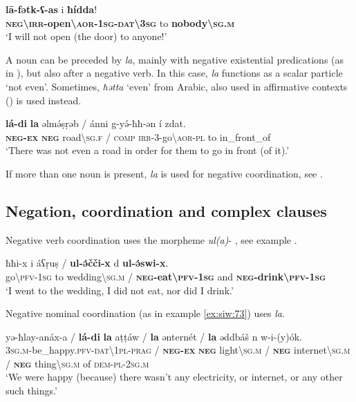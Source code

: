 \documentclass[output=paper,colorlinks,citecolor=brown]{langscibook}
\begin{document}
\ea\label{ex:siw:70}
    \gll \textbf{l\={a}-fətk-ʕ-as} i \textbf{ħídda}! \\
         \textbf{\textsc{neg{\textbackslash}irr}-open{\textbackslash}\textsc{aor-1sg-dat\textbackslash3sg}} to \textbf{nobody{\textbackslash}\textsc{sg.m}}  \\
    \glt ‘I will not open (the door) to anyone!’
\z

A noun can be preceded by \textit{la}, mainly with negative existential predications (as in ), but also after a negative verb. In this case, \textit{la} functions as a scalar particle ‘not even’. Sometimes, \textit{ħətta} ‘even’ from Arabic, also used in affirmative contexts (\citealt[214, 220]{Souag2013}) is used instead.

\ea\label{ex:siw:71}
    \gll \textbf{lá-di} \textbf{la} əlmə́ṣṛəb / ánni g-yə́-ħħ{}-ən \'{i}  zdat. \\
          \textbf{\textsc{neg-ex}} \textsc{\textbf{neg}} road{\textbackslash}\textsc{sg.f} / \textsc{comp} \textsc{irr-3}{}-go{\textbackslash}\textsc{aor-pl} to in\_front\_of \\
    \glt ‘There was not even a road in order for them to go in front (of it).’
\z

If more than one noun is present, \textit{la} is used for negative coordination, see . 


\subsection{Negation, coordination and complex clauses}\label{sec:siw:4.5}

Negative verb coordination uses the morpheme \textit{ul(a)}{}- \citep[54]{Schiattarella2017}, see example .

\ea\label{ex:siw:72}
    \gll ħħi-x i áʕṛuṣ / \textbf{ul-ə́čči-x} d \textbf{ul-ə́swi-x}. \\
         go{\textbackslash}\textsc{pfv}{}-1\textsc{sg} to wedding{\textbackslash}\textsc{sg.m} / \textbf{\textsc{neg}-eat{\textbackslash}\textsc{pfv}-\textsc{1sg}} and \textbf{\textsc{neg}-drink{\textbackslash}\textsc{pfv}-\textsc{1sg}} \\
    \glt ‘I went to the wedding, I did not eat, nor did I drink.’
\z

Negative nominal coordination (as in example \ref{ex:siw:73}) uses \textit{la}.


\ea\label{ex:siw:73}
    \gll yə-ħlay-anáx-a / \textbf{lá-di} \textbf{la} aṭṭáw / \textbf{la} ənternét / \textbf{la} əddbáš n w-i-(y)ók. \\ 
         \textsc{3sg.m}-be\_happy.\textsc{pfv}-\textsc{dat\textbackslash1pl-prag} / \textbf{\textsc{neg-ex}} \textbf{\textsc{neg}} light\textbackslash\textsc{sg.m} / \textbf{\textsc{neg}} internet\textbackslash\textsc{sg}.\textsc{m} /  \textbf{\textsc{neg}} thing\textbackslash\textsc{sg}.\textsc{m} of \textsc{dem-pl-2sg.m} \\
    \glt ‘We were happy (because) there wasn’t any electricity, or internet, or any other such things.’
\z 
\end{document}
